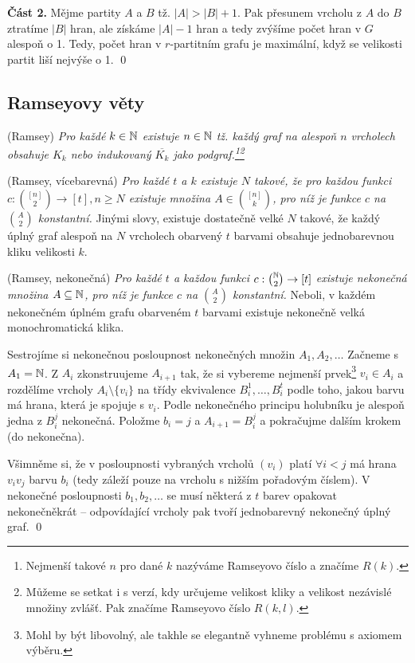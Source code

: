 \textbf{Část 2.} Mějme partity $A$ a $B$ tž. $|A| > |B| + 1$. Pak přesunem
vrcholu z $A$ do $B$ ztratíme $|B|$ hran, ale získáme $|A|-1$ hran a tedy
zvýšíme počet hran v $G$ alespoň o 1. Tedy, počet hran v $r$-partitním grafu je
maximální, když se velikosti partit liší nejvýše o 1.
\qed

\subsection{Ramseyovy věty}

\vt (Ramsey) {\it Pro každé $k \in \mathbb{N}$ existuje $n \in \mathbb{N}$ tž. každý graf na alespoň $n$ vrcholech obsahuje $K_k$ nebo indukovaný $\overline{K_k}$ jako podgraf.\footnote{Nejmenší takové $n$ pro dané $k$ nazýváme Ramseyovo číslo a značíme $R(k)$.}\footnote{Můžeme se setkat i s verzí, kdy určujeme velikost kliky a velikost nezávislé množiny zvlášť. Pak značíme Ramseyovo číslo $R(k,l)$.}}

\vt (Ramsey, vícebarevná) {\it Pro každé $t$ a $k$ existuje $N$ takové, že pro každou funkci $c: {[n]\choose 2} \rightarrow [t], n\geq N$ existuje množina $A \in {[n]\choose k}$, pro níž je funkce $c$ na $A\choose 2$ konstantní.} Jinými slovy, existuje dostatečně velké $N$ takové, že každý úplný graf alespoň na $N$ vrcholech obarvený $t$ barvami obsahuje jednobarevnou kliku velikosti $k$.

\vt (Ramsey, nekonečná) {\it Pro každé $t$ a každou funkci $c: {\mathbb{N}\choose 2} \rightarrow [t]$ existuje nekonečná množina $A\subseteq \mathbb{N}$, pro níž je funkce $c$ na $A\choose 2$ konstantní.} Neboli, v každém nekonečném úplném grafu obarveném $t$ barvami existuje nekonečně velká monochromatická klika.

\dk Sestrojíme si nekonečnou posloupnost nekonečných množin $A_1, A_2, \dots$ Začneme s $A_1 = \mathbb{N}$. Z $A_i$ zkonstruujeme $A_{i+1}$ tak, že si vybereme nejmenší prvek\footnote{Mohl by být libovolný, ale takhle se elegantně vyhneme problému s axiomem výběru.} $v_i \in A_i$ a rozdělíme vrcholy $A_i \setminus \{v_i\}$ na třídy ekvivalence $B_i^1, \dots, B_i^t$ podle toho, jakou barvu má hrana, která je spojuje s $v_i$. Podle nekonečného principu holubníku je alespoň jedna z $B_i^j$ nekonečná. Položme $b_i = j$ a $A_{i+1} = B_i^j$ a pokračujme dalším krokem (do nekonečna).

Všimněme si, že v posloupnosti vybraných vrcholů $(v_i)$ platí $\forall i < j$ má hrana $v_iv_j$ barvu $b_i$ (tedy záleží pouze na vrcholu s nižším pořadovým číslem). V nekonečné posloupnosti $b_1,b_2,\dots$ se musí některá z $t$ barev opakovat nekonečněkrát -- odpovídající vrcholy pak tvoří jednobarevný nekonečný úplný graf.
\qed

